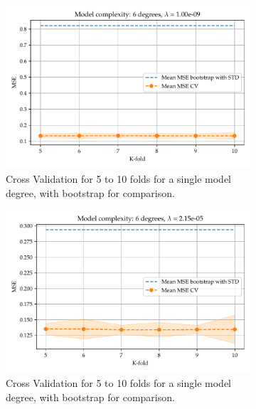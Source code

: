 \documentclass[11pt, a4paper]{article}
\begin{document}
\begin{figure}
  \centering
  \begin{subfigure}{0.49\textwidth}
    \centering
    \includegraphics[width=\textwidth]{figures/EX4_mse_cv_boot06.pdf}
    \caption{\label{fig:mse_cv_ridge_1}Cross Validation for 5 to 10 folds for a single model degree, with bootstrap for comparison.}
  \end{subfigure}
  \hfill
  \begin{subfigure}{0.49\textwidth}
    \centering
    \includegraphics[width=\textwidth]{figures/EX4_mse_cv_boot16.pdf}
    \caption{\label{fig:mse_cv_ridge_2}Cross Validation for 5 to 10 folds for a single model degree, with bootstrap for comparison.}
  \end{subfigure}
  \hfill
  \begin{subfigure}{0.49\textwidth}
    \centering

\end{subfigure}
\end{figure}
\end{document}
